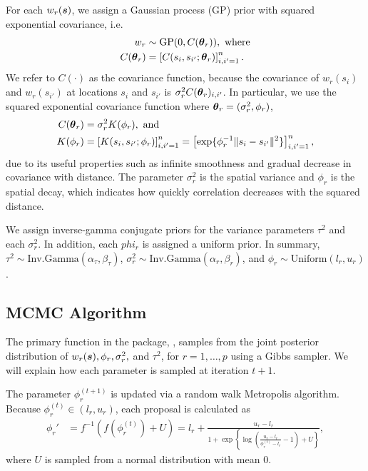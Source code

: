 For each $w_r(\boldsymbol{s})$, we assign a Gaussian process (GP) prior with squared exponential covariance, i.e.
\begin{align*}
    w_r &\sim \text{GP}(0, C(\boldsymbol{\theta}_r)), \text{ where}\\
    C(\boldsymbol{\theta}_r) &= \left[C(s_i, s_{i'}; \boldsymbol{\theta}_r)\right]_{i, i' = 1}^n.
\end{align*}
We refer to $C(\cdot)$ as the covariance function, because the covariance of $w_r(s_i)$ and $w_r(s_{i'})$ at locations $s_i$ and $s_{i'}$ is $\sigma_r^2 C(\boldsymbol{\theta}_r)_{i, i'}$. In particular, we use the squared exponential covariance function where $\boldsymbol{\theta}_r = (\sigma_r^2, \phi_r)$,
\begin{align*}
    C(\boldsymbol{\theta}_r) &= \sigma_r^2 K(\phi_r), \text{ and}\\
    K(\phi_r) &= \left[ K(s_i, s_{i'}; \phi_r) \right]_{i, i' = 1}^n = \left[\exp\{\phi_r^{-1}\|s_i-s_{i'}\|^2\}\right]_{i, i' = 1}^n,
\end{align*}
due to its useful properties such as infinite smoothness and gradual decrease in covariance with distance. The parameter $\sigma_r^2$ is the spatial variance and $\phi_r$ is the spatial decay, which indicates how quickly correlation decreases with the squared distance.

We assign inverse-gamma conjugate priors for the variance parameters $\tau^2$ and each $\sigma_r^2$. In addition, each $phi_r$ is assigned a uniform prior. In summary, $\tau^2 \sim \text{Inv.Gamma}(\alpha_\tau, \beta_\tau)$, $\sigma_r^2 \sim \text{Inv.Gamma}(\alpha_r, \beta_r)$, and $\phi_r \sim \text{Uniform}(l_r, u_r)$.

\subsection{MCMC Algorithm}
\label{sec:mcmc}
The primary function in the  package, , samples from the joint posterior distribution of $w_r(\boldsymbol{s}), \phi_r, \sigma_r^2,$ and $\tau^2$, for $r = 1, \dots, p$ using a Gibbs sampler. We will explain how each parameter is sampled at iteration $t+1$.

The parameter $\phi_r^{(t+1)}$ is updated via a random walk Metropolis algorithm. Because $\phi_r^{(t)} \in (l_r, u_r)$, each proposal is calculated as 
\begin{align*}
    \phi_r' &= f^{-1}(f(\phi_r^{(t)}) + U) = l_r + \frac{u_r - l_r}{1 + \exp\left\{\log\left(\frac{u_r - l_r}{\phi_r^{(t)} - l_r} - 1\right) + U\right\}},
\end{align*}
where $U$ is sampled from a normal distribution with mean $0$.

